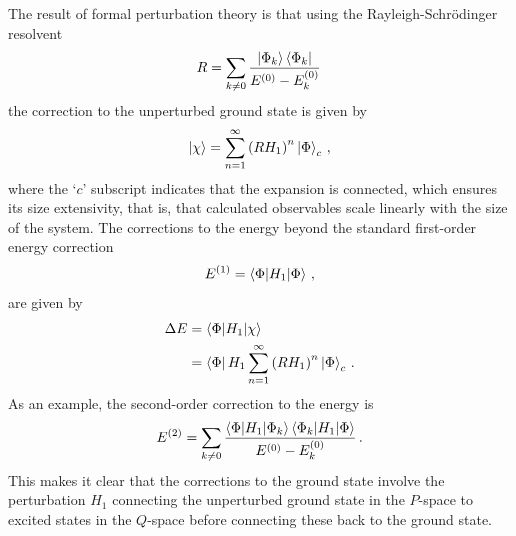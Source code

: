 The result of formal perturbation theory is that
using the Rayleigh-Schr\"{o}dinger resolvent
\begin{equation}
  R = \sum_{k\neq 0} \frac{\ket{\Phi_k}\bra{\Phi_k}}{E^{(0)} - E^{(0)}_{k}} \,
\end{equation}
the correction to the unperturbed ground state is given by
\begin{equation}
  \ket{\chi} = \sum_{n=1}^{\infty}{(R H_1)}^n \ket{\Phi}_c\,,
\end{equation}
where the `$c$' subscript indicates that the expansion is connected,
which ensures its size extensivity,
that is, that calculated observables scale linearly with the size of the system.
The corrections to the energy beyond the standard first-order energy correction
\begin{equation}
  E^{(1)} = \braket{\Phi | H_1 | \Phi}\,,
\end{equation}
are given by
\begin{align}
  \Delta E &= \braket{\Phi | H_1 | \chi} \\
          &= \bra{\Phi}  H_1 \sum_{n=1}^{\infty}{(R H_1)}^n \ket{\Phi}_c\,.
\end{align}
As an example, the second-order correction to the energy is
\begin{equation}
  E^{(2)} = \sum_{k\neq 0} \frac{\braket{\Phi | H_1 | \Phi_k}\braket{\Phi_k | H_1 | \Phi}}
  {E^{(0)} - E^{(0)}_k}\,.
\end{equation}
This makes it clear that the corrections to the ground state involve
the perturbation $H_1$ connecting the unperturbed ground state in the $P$-space
to excited states in the $Q$-space before connecting these back to the ground state.

